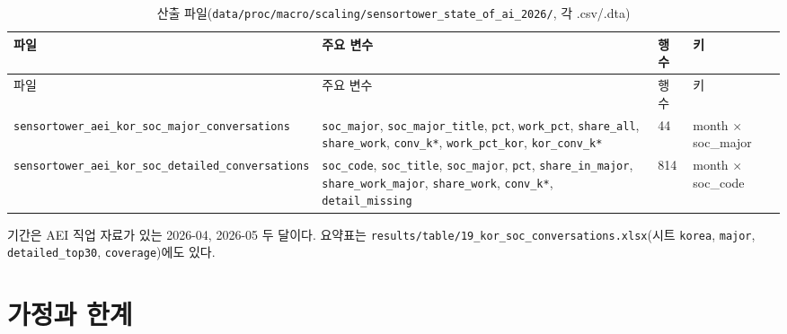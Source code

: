 \documentclass[11pt]{article}
\begin{document}
\begin{longtable}{L{5.6cm}L{7.0cm}R{1.0cm}L{2.2cm}}
\caption{산출 파일(\texttt{data/proc/macro/scaling/sensortower\_state\_of\_ai\_2026/}, 각 .csv/.dta)}\label{tab:files}\\
\toprule
파일 & 주요 변수 & 행 수 & 키 \\
\midrule
\endfirsthead
\toprule
파일 & 주요 변수 & 행 수 & 키 \\
\midrule
\endhead
\texttt{sensortower\_aei\_kor\_soc\_major\_conversations} & \texttt{soc\_major}, \texttt{soc\_major\_title}, \texttt{pct}, \texttt{work\_pct}, \texttt{share\_all}, \texttt{share\_work}, \texttt{conv\_k*}, \texttt{work\_pct\_kor}, \texttt{kor\_conv\_k*} & 44 & month $\times$ soc\_major \\
\texttt{sensortower\_aei\_kor\_soc\_detailed\_conversations} & \texttt{soc\_code}, \texttt{soc\_title}, \texttt{soc\_major}, \texttt{pct}, \texttt{share\_in\_major}, \texttt{share\_work\_major}, \texttt{share\_work}, \texttt{conv\_k*}, \texttt{detail\_missing} & 814 & month $\times$ soc\_code \\
\bottomrule
\end{longtable}

기간은 AEI 직업 자료가 있는 2026-04, 2026-05 두 달이다. 요약표는 \texttt{results/table/19\_kor\_soc\_conversations.xlsx}(시트 \texttt{korea}, \texttt{major}, \texttt{detailed\_top30}, \texttt{coverage})에도 있다.

\section{가정과 한계}
\end{document}
